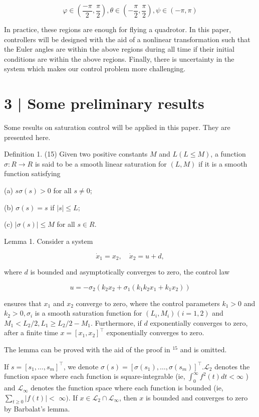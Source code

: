 \documentclass[10pt]{article}
\begin{document}
$$
\varphi \in\left(\frac{-\pi}{2}, \frac{\pi}{2}\right), \theta \in\left(-\frac{\pi}{2}, \frac{\pi}{2}\right), \psi \in(-\pi, \pi)
$$

In practice, these regions are enough for flying a quadrotor. In this paper, controllers will be designed with the aid of a nonlinear transformation such that the Euler angles are within the above regions during all time if their initial conditions are within the above regions. Finally, there is uncertainty in the system which makes our control problem more challenging.

\section{3 | Some preliminary results}
Some results on saturation control will be applied in this paper. They are presented here.

Definition 1. (15) Given two positive constants $M$ and $L(L \leq M)$, a function $\sigma: R \rightarrow R$ is said to be a smooth linear saturation for $(L, M)$ if it is a smooth function satisfying

(a) $s \sigma(s)>0$ for all $s \neq 0$;

(b) $\sigma(s)=s$ if $|s| \leq L$;

(c) $|\sigma(s)| \leq M$ for all $s \in R$.

Lemma 1. Consider a system

$$
\dot{x}_{1}=x_{2}, \quad \dot{x}_{2}=u+d,
$$

where $d$ is bounded and asymptotically converges to zero, the control law

$$
u=-\sigma_{2}\left(k_{2} x_{2}+\sigma_{1}\left(k_{1} k_{2} x_{1}+k_{1} x_{2}\right)\right)
$$

ensures that $x_{1}$ and $x_{2}$ converge to zero, where the control parameters $k_{1}>0$ and $k_{2}>0, \sigma_{i}$ is a smooth saturation function for $\left(L_{i}, M_{i}\right)(i=1,2)$ and $M_{1}<L_{2} / 2, L_{1} \geq L_{2} / 2-M_{1}$. Furthermore, if $d$ exponentially converges to zero, after a finite time $x=\left[x_{1}, x_{2}\right]^{\top}$ exponentially converges to zero.

The lemma can be proved with the aid of the proof in ${ }^{15}$ and is omitted.

If $s=\left[s_{1}, \ldots, s_{m}\right]^{\top}$, we denote $\sigma(s)=\left[\sigma\left(s_{1}\right), \ldots, \sigma\left(s_{m}\right)\right]^{\top} . \mathcal{L}_{2}$ denotes the function space where each function is square-integrable (ie, $\int_{0}^{\infty} f^{2}(t) d t<\infty$ ) and $\mathcal{L}_{\infty}$ denotes the function space where each function is bounded (ie, $\sum_{t \geq 0}|f(t)|<$ $\infty)$. If $x \in \mathcal{L}_{2} \cap \mathcal{L}_{\infty}$, then $x$ is bounded and converges to zero by Barbalat's lemma.
\end{document}
